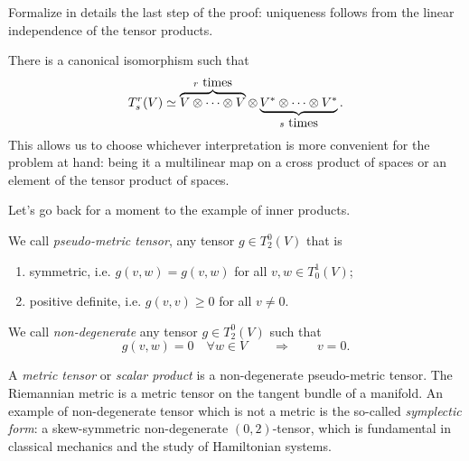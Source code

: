 \begin{exercise}
Formalize in details the last step of the proof: uniqueness follows from the linear independence of the tensor products.
\end{exercise}

\begin{remark}
  There is a canonical isomorphism such that
  \begin{equation}
    T^r_s(V) \simeq \LaTeXoverbrace{V\otimes \cdots \otimes V}^{r\mbox{ times}} \otimes \LaTeXunderbrace{V^*\otimes \cdots \otimes V^*}_{s\mbox{ times}}.
  \end{equation}
  This allows us to choose whichever interpretation is more convenient for the problem at hand: being it a multilinear map on a cross product of spaces or an element of the tensor product of spaces.
\end{remark}


Let's go back for a moment to the example of inner products.

\begin{definition}\label{def:metric}
  We call \emph{pseudo-metric tensor}, any tensor $g\in T_2^0(V)$ that is
  \begin{enumerate}
    \item symmetric, i.e. $g(v,w) = g(v,w)$ for all $v,w\in T_0^1(V)$;
    \item positive definite, i.e. $g(v,v)\geq0$ for all $v\neq 0$.
  \end{enumerate}
  
  We call \emph{non-degenerate} any tensor $g\in T_2^0(V)$ such that
  \begin{equation}
    g(v,w) = 0 \quad\forall w\in V \qquad\Longrightarrow\qquad v=0.
  \end{equation}
  
  A \emph{metric tensor} or \emph{scalar product} is a non-degenerate pseudo-metric tensor.
  The Riemannian metric is a metric tensor on the tangent bundle of a manifold.
  An example of non-degenerate tensor which is not a metric is the so-called \emph{symplectic form}: a skew-symmetric non-degenerate $(0,2)$-tensor, which is fundamental in classical mechanics and the study of Hamiltonian systems.
\end{definition}

